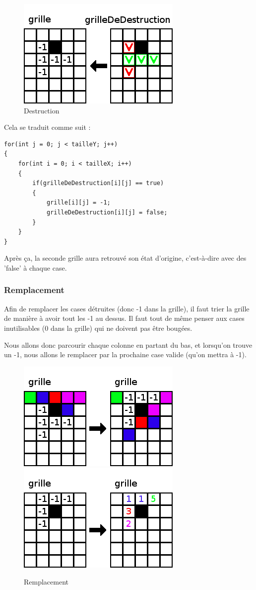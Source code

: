 \begin{figure}[ht]
	\center
	\caption{\label{Destruction} Destruction}
	\includegraphics{imgs/Destruction}
\end{figure}

Cela se traduit comme suit :

\begin{lstlisting}
for(int j = 0; j < tailleY; j++)
{
	for(int i = 0; i < tailleX; i++)
	{
		if(grilleDeDestruction[i][j] == true)
		{
			grille[i][j] = -1;
			grilleDeDestruction[i][j] = false;
		}
	}
}
\end{lstlisting}

Après ça, la seconde grille aura retrouvé son état d'origine, c'est-à-dire avec des 'false' à chaque case.

\subsubsection{Remplacement}

	Afin de remplacer les cases détruites (donc -1 dans la grille), il faut trier la grille de manière à avoir tout les -1 au dessus.
	Il faut tout de même penser aux cases inutilisables (0 dans la grille) qui ne doivent pas être bougées.
	
	Nous allons donc parcourir chaque colonne en partant du bas, et lorsqu'on trouve un -1, nous allons le remplacer par la prochaine case valide (qu'on mettra à -1).
	
\begin{figure}[hpt]
	\center
	\caption{\label{Remplacement} Remplacement}
	\includegraphics{imgs/Remplacement1}
	\includegraphics{imgs/Remplacement2}
\end{figure}
	
